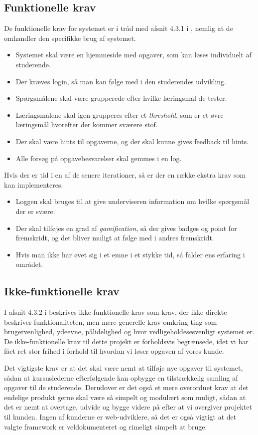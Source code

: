 \documentclass[12pt]{article}
\begin{document}
\subsection{Funktionelle krav}
De funktionelle krav for systemet er i tråd med afsnit 4.3.1 i \cite{OOSE}, nemlig at de omhandler den specifikke brug af systemet.
\begin{itemize}
    \item Systemet skal være en hjemmeside med opgaver, som kan løses individuelt af studerende.
    \item Der kræves login, så man kan følge med i den studerendes udvikling.
    \item Spørgsmålene skal være grupperede efter hvilke læringsmål de tester.
    \item Læringsmålene skal igen grupperes efter et \emph{threshold}, som er et øvre læringsmål hvorefter der kommer sværere stof.
    \item Der skal være hints til opgaverne, og der skal kunne gives feedback til hints.
    \item Alle forsøg på opgavebesvarelser skal gemmes i en log.
\end{itemize}
Hvis der er tid i en af de senere iterationer, så er der en række ekstra krav som kan implementeres.
\begin{itemize}
    \item Loggen skal bruges til at give underviseren information om hvilke spørgsmål der er svære.
    \item Der skal tilføjes en grad af \emph{gamification}, så der gives badges og point for fremskridt, og det bliver muligt at følge med i andres fremskridt.
    \item Hvis man ikke har øvet sig i et emne i et stykke tid, så falder ens erfaring i området.
\end{itemize}

\subsection{Ikke-funktionelle krav}
I afsnit 4.3.2 i \cite{OOSE} beskrives ikke-funktionelle krav som krav, der ikke direkte beskriver funktionaliteten, men mere generelle krav omkring ting som brugervenlighed, ydeevne, pålidelighed og hvor vedligeholdesesvenligt systemet er. De ikke-funktionelle krav til dette projekt er forholdsvis begrænsede, idet vi har fået ret stor frihed i forhold til hvordan vi løser opgaven af vores kunde.

Det vigtigste krav er at det skal være nemt at tilføje nye opgaver til systemet, sådan at kursuslederne efterfølgende kan opbygge en tilstrækkelig samling af opgaver til de studerende. Derudover er det også et mere overordnet krav at det endelige produkt gerne skal være så simpelt og modulært som muligt, sådan at det er nemt at overtage, udvide og bygge videre på efter at vi overgiver projektet til kunden. Ingen af kunderne er web-udviklere, så det er også vigtigt at det valgte framework er veldokumenteret og rimeligt simpelt at bruge.
\end{document}
